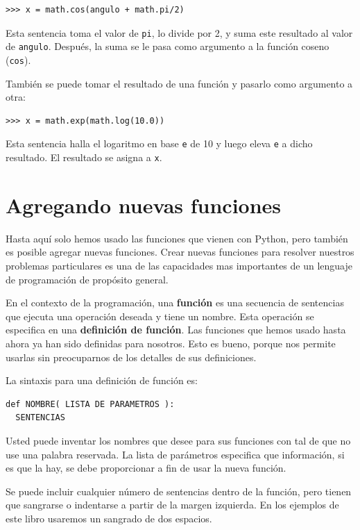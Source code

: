 \beforeverb
\begin{verbatim}
>>> x = math.cos(angulo + math.pi/2)
\end{verbatim}
\afterverb
%
Esta sentencia toma el valor de \texttt{pi}, lo divide por 2, y suma este
resultado al valor de  \texttt{angulo}.  Después, la suma se le pasa como argumento
a la función coseno (\texttt{cos}).

También se puede tomar el resultado de una función y pasarlo como 
argumento a otra:

\beforeverb
\begin{verbatim}
>>> x = math.exp(math.log(10.0))
\end{verbatim}
\afterverb
%
Esta sentencia halla el logaritmo en base \texttt{e} de 10 y luego eleva \texttt{e} a dicho 
resultado. El resultado se asigna a  \texttt{x}.


\section{Agregando nuevas funciones}

Hasta aquí solo hemos usado las funciones que vienen con Python, pero también es posible 
agregar nuevas funciones. Crear nuevas funciones para resolver nuestros problemas 
particulares es una de las capacidades mas importantes de un lenguaje de programación
de propósito general.

En el contexto de la programación, una {\bf función} es una secuencia de sentencias que
ejecuta una operación deseada y tiene un nombre.  Esta operación se especifica en una
{\bf definición de función}.  Las funciones que hemos usado hasta ahora ya han sido
definidas para nosotros. Esto es bueno, porque nos permite usarlas sin preocuparnos
de los detalles de sus definiciones.


La sintaxis para una definición de función es:

\beforeverb
\begin{verbatim}
def NOMBRE( LISTA DE PARAMETROS ):
  SENTENCIAS
\end{verbatim}
\afterverb
%
Usted puede inventar los nombres que desee para sus funciones con tal de que no 
use una palabra reservada. La lista de parámetros especifica que información, si es
que la hay, se debe proporcionar a fin de usar la nueva función.

Se puede incluir cualquier número de sentencias dentro de la función, pero
tienen que sangrarse o indentarse a partir de la margen izquierda. En los ejemplos de
este libro usaremos un sangrado de dos espacios.

